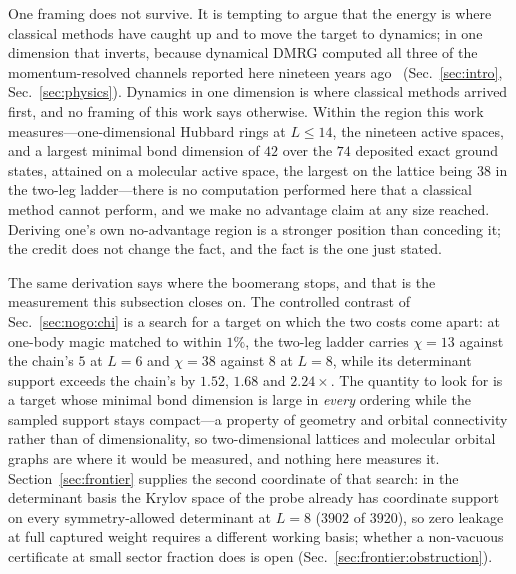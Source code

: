 One framing does not survive. It is tempting to argue that the energy is where classical methods have caught up and to move the target to dynamics; in one dimension that inverts,
because dynamical DMRG computed all three of the momentum-resolved channels reported here nineteen
years ago~\cite{benthien2007} (Sec.~\ref{sec:intro}, Sec.~\ref{sec:physics}).
Dynamics in one dimension is where classical methods arrived first, and no framing of this work
says otherwise. Within the region this work measures---one-dimensional Hubbard rings at $L\le14$, the
nineteen active spaces, and a largest minimal bond dimension of $42$ over the $74$ deposited exact
ground states, attained on a molecular active space, the largest on the lattice being $38$ in the
two-leg ladder---there is no computation performed
here that a classical method cannot perform, and we make no advantage claim at any size reached.
Deriving one's own no-advantage region is a stronger position than conceding it; the credit does not
change the fact, and the fact is the one just stated.

The same derivation says where the boomerang stops, and that is the measurement this subsection closes
on. The controlled contrast of Sec.~\ref{sec:nogo:chi} is a search for a target on which the two costs
come apart: at one-body magic matched to within $1\%$, the two-leg ladder carries $\chi=13$ against the
chain's $5$ at $L=6$ and $\chi=38$ against $8$ at $L=8$, while its determinant support exceeds the
chain's by $1.52$, $1.68$ and $2.24\times$. The quantity to look for is a target whose minimal bond
dimension is large in \emph{every} ordering while the sampled support stays compact---a property of
geometry and orbital connectivity rather than of dimensionality, so two-dimensional lattices and
molecular orbital graphs are where it would be measured, and nothing here measures it.
Section~\ref{sec:frontier} supplies the second coordinate of that search: in the determinant basis the
Krylov space of the probe already has coordinate support on every symmetry-allowed determinant at $L=8$ ($3902$ of $3920$), so zero leakage at full captured weight requires a different working basis; whether a non-vacuous certificate at small sector fraction does is open (Sec.~\ref{sec:frontier:obstruction}).

